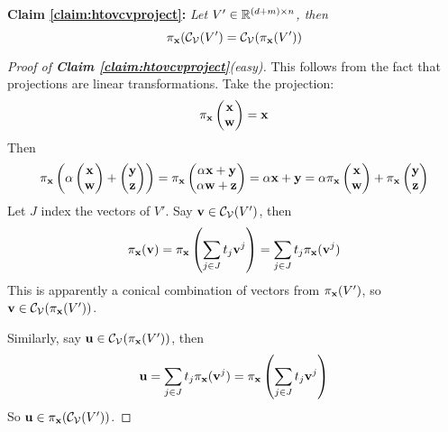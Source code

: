\documentclass[a4,fleqn]{article}
\begin{document}
\textbf{Claim \ref{claim:htovcvproject}:}
  \textit{Let $V' \in \mathbb{R}^{(d+m) \times n}$, then }
 \[ \pi_{\mathbf{x}}(\mathcal{C}_{\mathcal{V}}(V') = \mathcal{C}_{\mathcal{V}}(\pi_{\mathbf{x}}(V')) \]
\begin{proof}[Proof of \textnormal{\textbf{Claim \ref{claim:htovcvproject}}}(easy)]
This follows from the fact that projections are linear transformations.  Take the projection:
\[ \pi_{\x}\svec{\x}{\w} = \x\]
Then
\[ \pi_{\x}\left( \alpha \svec{\x}{\w} + \svec{\y}{\z}\right) = 
    \pi_{\x}\svec{\alpha \x + \y}{\alpha \w + \z} = \alpha \x + \y =
    \alpha \pi_{\x}\svec{\x}{\w} + \pi_{\x}\svec{\y}{\z} \]
Let $J$ index the vectors of $V'$.  Say $\mathbf{v} \in \mathcal{C}_{\mathcal{V}}(V')$, then
\[ \pi_{\mathbf{x}}(\mathbf{v}) = \pi_{\mathbf{x}}\left(\sum_{j\in J}t_j\mathbf{v}^j\right) = 
      \sum_{j\in J}t_j\pi_{\mathbf{x}}(\mathbf{v}^j) \]
This is apparently a conical combination of vectors from $\pi_{\mathbf{x}}(V')$, so $\mathbf{v} \in \mathcal{C}_{\mathcal{V}}(\pi_{\mathbf{x}}(V'))$.

Similarly, say $\mathbf{u} \in \mathcal{C}_{\mathcal{V}}(\pi_{\mathbf{x}}(V'))$, then
\[ \mathbf{u} = \sum_{j\in J}t_j\pi_{\mathbf{x}}(\mathbf{v}^j) = 
      \pi_{\mathbf{x}}\left(\sum_{j\in J}t_j\mathbf{v}^j\right)\]
So $\mathbf{u} \in \pi_{\mathbf{x}}(\mathcal{C}_{\mathcal{V}}(V'))$.
\end{proof}

%
%
%
%
%
%
%
%
%
%
%
%
%
\end{document}

